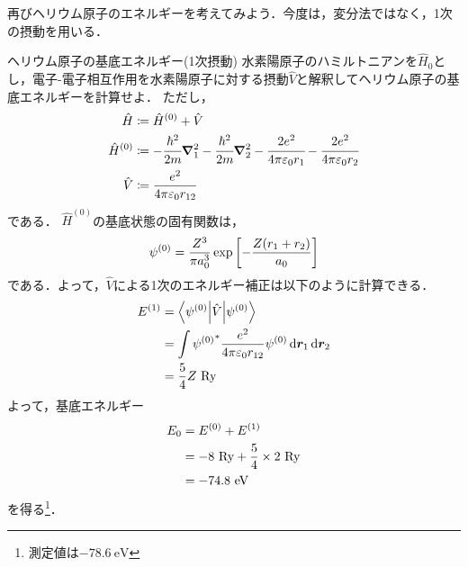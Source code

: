 \documentclass{report}
\begin{document}
  再びヘリウム原子のエネルギーを考えてみよう．今度は，変分法ではなく，1次の摂動を用いる．
  \begin{myex}{ヘリウム原子の基底エネルギー(1次摂動)}{}
    水素陽原子のハミルトニアンを$\hat{H}_0$とし，電子-電子相互作用を水素陽原子に対する摂動$\hat{V}$と解釈してヘリウム原子の基底エネルギーを計算せよ．
    ただし，
    \begin{align}
      \hat{H} &\coloneqq \hat{H}^{(0)} + \hat{V} \\ 
      \hat{H}^{(0)} &\coloneqq -\cfrac{\hbar^2}{2m}\grad_{1}^{2} -\cfrac{\hbar^2}{2m}\grad_{2}^{2} - \cfrac{2e^2}{4\pi \varepsilon_0 r_1}-\cfrac{2e^2}{4\pi \varepsilon_0 r_2} \\ 
      \hat{V} &\coloneqq \frac{e^2}{4\pi\varepsilon_0r_{12}} \\ 
    \end{align}
    である．
    \tcblower
    $\hat{H}^{(0)}$の基底状態の固有関数は，
    \begin{align}
      \psi^{(0)} = \frac{Z^3}{\pi a_0^3}\exp\qty[-\frac{Z(r_1+r_2)}{a_0}]
    \end{align}
    である．よって，$\hat{V}$による1次のエネルギー補正は以下のように計算できる．
    \begin{align}
      E^{(1)} &= \mel**{\psi^{(0)}}{\hat{V}}{\psi^{(0)}} \\
      &= \int{\psi^{(0)}}^{*}\frac{e^2}{4\pi\varepsilon_0r_{12}}\psi^{(0)}\dd{\bm{r}_1}\dd{\bm{r}_2} \\
      &= \frac{5}{4}Z\ \mathrm{Ry}
    \end{align}
    よって，基底エネルギー
    \begin{align}
      E_0 &= E^{(0)} + E^{(1)}\\
      &= -8\ \mathrm{Ry} + \frac{5}{4}\times{2}\ \mathrm{Ry}\\
      &= -74.8\ \mathrm{eV}
    \end{align}
    を得る\footnote{測定値は$-78.6\ \mathrm{eV}$}．
  \end{myex}
\end{document}
